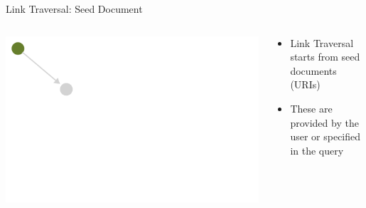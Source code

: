 
\begin{frame}{Link Traversal: Seed Document}
    \begin{columns}[T] %
        \begin{column}{0.6\textwidth} %
            \includegraphics[width=\linewidth]{images/showing-link-traversal-step-0.pdf} %
        \end{column}

        \begin{column}{0.4\textwidth} %
            \begin{itemize}
                \item Link Traversal starts from seed documents (URIs)
                \item These are provided by the user or specified in the query
            \end{itemize}
        \end{column}
    \end{columns}
\end{frame}

